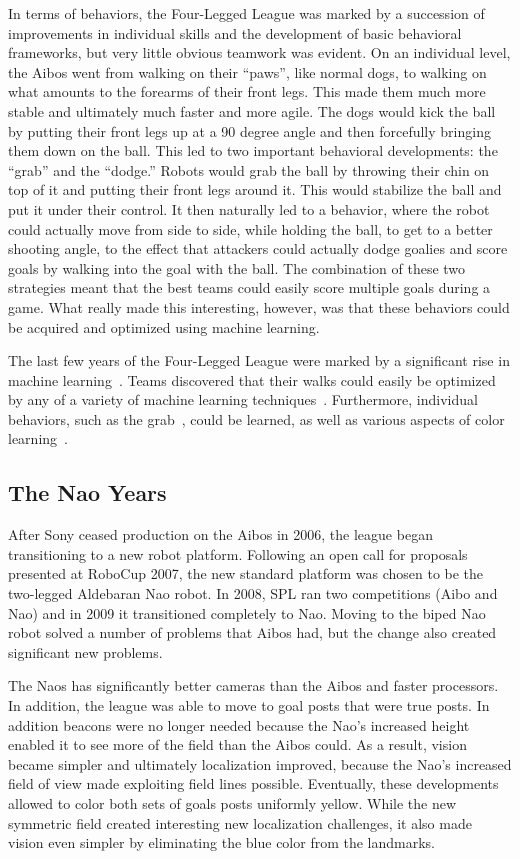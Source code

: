 \documentclass{llncs}
\begin{document}
In terms of behaviors, the Four-Legged League was marked by a succession
of improvements in individual skills and the development of basic behavioral
frameworks, but very little obvious teamwork was evident. On an individual
level, the Aibos went from walking on their ``paws'', like normal dogs, to walking
on what amounts to the forearms of their front legs. This made them much
more stable and ultimately much faster and more agile.  The dogs would
kick the ball by putting their front legs up at a 90 degree angle and then forcefully bringing
them down on the ball. This led to two important behavioral developments: the
``grab'' and the ``dodge.'' Robots would grab the ball by throwing their
chin on top of it and putting their front legs around it. This would stabilize the
ball and put it under their control. It then naturally led to a behavior, where
the robot could actually move from side to side, while holding the ball, to
get to a better shooting angle, to the effect that attackers could actually dodge
goalies and score goals by walking into the goal with the ball. The combination of these two strategies meant
that the best teams could easily score multiple goals during a game. What really
made this interesting, however, was that these behaviors could be acquired and optimized using machine
learning. 

The last few years of the Four-Legged League were marked by a significant
rise in machine learning~\cite{chalup-07}. Teams discovered that their walks could easily
be optimized by any of a variety of machine learning techniques~\cite{kohl-04,chernova-04}.
Furthermore,
individual behaviors, such as the grab~\cite{fidelman-07}, could be learned, as well as various
aspects of color learning~\cite{quinlan-04}.

\subsection{The Nao Years}

After Sony ceased production on the Aibos in 2006, the league began
transitioning to a new robot platform. Following an open call for proposals presented at RoboCup 2007, 
the new standard platform was chosen to be the two-legged Aldebaran
Nao robot. In 2008, SPL ran two competitions (Aibo and Nao) and in 2009 it transitioned
completely to Nao. Moving to the biped Nao robot solved a number of
problems that Aibos had, but the change also created significant new problems.

The Naos has significantly better cameras than the Aibos and faster
processors. In addition, the league was able to move to goal posts
that were true posts. In addition beacons were no longer needed because the
Nao's increased height enabled it to see more of the field than the
Aibos could.
As a result, vision became simpler and ultimately localization improved, because
the Nao's increased field of view made exploiting field lines possible. Eventually,
these developments allowed to color both sets of goals posts uniformly yellow. While
the new symmetric field created interesting new localization challenges, it also made vision
even simpler by eliminating the blue color from the landmarks.
\end{document}
